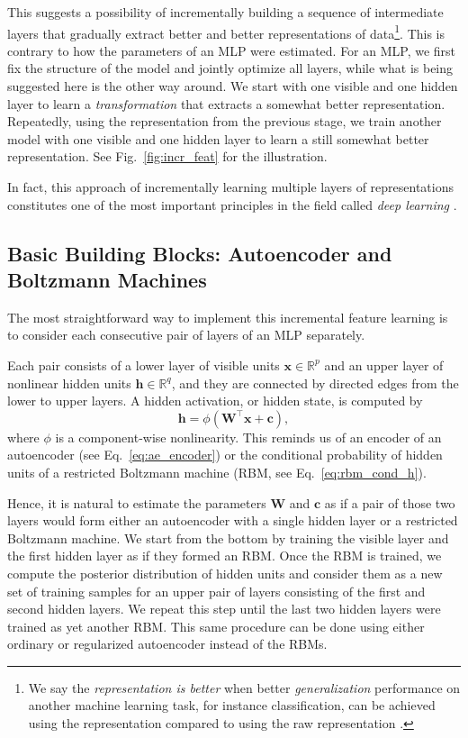 \documentclass[dissertation,nocontribution,draft*]{aaltoseries}
\newcommand{\vect}[1]{\mathbf{#1}}
\newcommand{\matr}[1]{\mathbf{#1}}
\newcommand{\vc}[0]{\vect{c}}
\newcommand{\vh}[0]{\vect{h}}
\newcommand{\vx}[0]{\vect{x}}
\newcommand{\mW}[0]{\matr{W}}
\newcommand{\RR}[0]{\mathbb{R}}
\begin{document}
This suggests a possibility of incrementally building a
sequence of intermediate layers that gradually extract
better and better representations of data\footnote{We say
the \textit{representation is better} when better
\textit{generalization} performance on another machine
learning task, for instance classification, can be achieved
using the representation compared to using the raw
representation \citep{Bengio2007nips}.}. This is contrary to
how the parameters of an MLP were estimated. For an MLP, we
first fix the structure of the model and jointly optimize
all layers, while what is being suggested here is the
other way around. We start with one visible and one hidden
layer to learn a \textit{transformation} that extracts a
somewhat better representation. Repeatedly, using the
representation from the previous stage, we train another
model with one visible and one hidden layer to learn a
still somewhat
better representation. See Fig.~\ref{fig:incr_feat}
for the illustration.

In fact, this approach of incrementally learning multiple
layers of representations constitutes one of the most important
principles in the field called \textit{deep learning}
\citep[see, e.g.,][]{Bengio2009a}.

\subsection{Basic Building Blocks: Autoencoder and Boltzmann
Machines}
\label{sec:basic_blocks1}

The most straightforward way to implement this incremental
feature learning is to consider each consecutive pair of
layers of an MLP separately. 

Each pair consists of a lower layer of visible units $\vx
\in \RR^p$ and an upper layer of nonlinear hidden units $\vh
\in \RR^q$, and they are connected by directed edges from
the lower to upper layers. A hidden activation, or hidden
state, is computed by 
\[
\vh = \phi\left( \mW^\top \vx + \vc \right),
\]
where $\phi$ is a component-wise nonlinearity.  This reminds
us of an encoder of an autoencoder (see
Eq.~\eqref{eq:ae_encoder}) or the conditional probability of
hidden units of a restricted Boltzmann machine (RBM, see
Eq.~\eqref{eq:rbm_cond_h}).

Hence, it is natural to estimate the parameters $\mW$ and
$\vc$ as if a pair of those two layers would form either an
autoencoder with a single hidden layer or a restricted
Boltzmann machine. We start from the bottom by training the
visible layer and the first hidden layer as if they formed
an RBM. Once the RBM is trained, we compute the posterior
distribution of hidden units and consider them as a new set
of training samples for an upper pair of layers consisting
of the first and second hidden layers. We repeat this step
until the last two hidden layers were trained as yet
another RBM. This same procedure can be done using
either ordinary or regularized autoencoder instead of the
RBMs.
\end{document}
